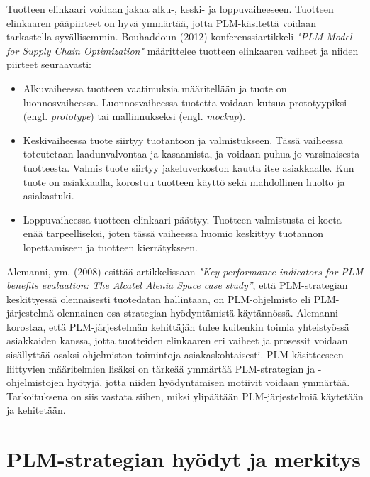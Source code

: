 Tuotteen elinkaari voidaan jakaa alku-, keski- ja loppuvaiheeseen. Tuotteen elinkaaren pääpiirteet on hyvä ymmärtää, jotta PLM-käsitettä voidaan tarkastella syvällisemmin. Bouhaddoun (2012) konferenssiartikkeli \textit{"PLM Model for Supply Chain Optimization"} määrittelee tuotteen elinkaaren vaiheet ja niiden piirteet seuraavasti:  \cite{bouhaddou_plm_2012}
\begin{itemize}
\item Alkuvaiheessa tuotteen vaatimuksia määritellään ja tuote on luonnosvaiheessa. Luonnosvaiheessa tuotetta voidaan kutsua prototyypiksi (engl. \textit{prototype}) tai mallinnukseksi (engl. \textit{mockup}).
\item Keskivaiheessa tuote siirtyy tuotantoon ja valmistukseen. Tässä vaiheessa toteutetaan laadunvalvontaa ja kasaamista, ja voidaan puhua jo varsinaisesta tuotteesta. Valmis tuote siirtyy jakeluverkoston kautta itse asiakkaalle. Kun tuote on asiakkaalla, korostuu tuotteen käyttö sekä mahdollinen huolto ja asiakastuki.
\item Loppuvaiheessa tuotteen elinkaari päättyy. Tuotteen valmistusta ei koeta enää tarpeelliseksi, joten tässä vaiheessa huomio keskittyy tuotannon lopettamiseen ja tuotteen kierrätykseen.
\end{itemize}
Alemanni, ym. (2008) esittää artikkelissaan \textit{"Key performance indicators for PLM benefits evaluation: The Alcatel Alenia Space case study”}, että PLM-strategian keskittyessä olennaisesti tuotedatan hallintaan, on PLM-ohjelmisto eli PLM-järjestelmä olennainen osa strategian hyödyntämistä käytännössä.  \cite{alemanni_key_2008} Alemanni korostaa, että PLM-järjestelmän kehittäjän tulee kuitenkin toimia yhteistyössä asiakkaiden kanssa, jotta tuotteiden elinkaaren eri vaiheet ja prosessit voidaan sisällyttää osaksi ohjelmiston toimintoja asiakaskohtaisesti. PLM-käsitteeseen liittyvien määritelmien lisäksi on tärkeää ymmärtää PLM-strategian ja -ohjelmistojen hyötyjä, jotta niiden hyödyntämisen motiivit voidaan ymmärtää. Tarkoituksena on siis vastata siihen, miksi ylipäätään PLM-järjestelmiä käytetään ja kehitetään.

\section{PLM-strategian hyödyt ja merkitys} \label{PLM strategian hyödyt ja merkitys}

